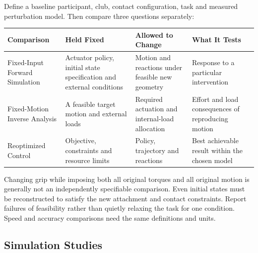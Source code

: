 \documentclass[
  11pt,
]{article}
\begin{document}
Define a baseline participant, club, contact configuration, task and
measured perturbation model. Then compare three questions separately:

\begin{longtable}[]{@{}
  >{\raggedright\arraybackslash}p{}
  >{\raggedright\arraybackslash}p{}
  >{\raggedright\arraybackslash}p{}
  >{\raggedright\arraybackslash}p{}@{}}
\toprule\noalign{}
\begin{minipage}[b]{\linewidth}\raggedright
Comparison
\end{minipage} & \begin{minipage}[b]{\linewidth}\raggedright
Held Fixed
\end{minipage} & \begin{minipage}[b]{\linewidth}\raggedright
Allowed to Change
\end{minipage} & \begin{minipage}[b]{\linewidth}\raggedright
What It Tests
\end{minipage} \\
\midrule\noalign{}
\endhead
\bottomrule\noalign{}
\endlastfoot
Fixed-Input Forward Simulation & Actuator policy, initial state
specification and external conditions & Motion and reactions under
feasible new geometry & Response to a particular intervention \\
Fixed-Motion Inverse Analysis & A feasible target motion and external
loads & Required actuation and internal-load allocation & Effort and
load consequences of reproducing motion \\
Reoptimized Control & Objective, constraints and resource limits &
Policy, trajectory and reactions & Best achievable result within the
chosen model \\
\end{longtable}

Changing grip while imposing both all original torques and all original
motion is generally not an independently specifiable comparison. Even
initial states must be reconstructed to satisfy the new attachment and
contact constraints. Report failures of feasibility rather than quietly
relaxing the task for one condition. Speed and accuracy comparisons need
the same definitions and units.

\subsection{Simulation Studies}\label{simulation-studies}
\end{document}
